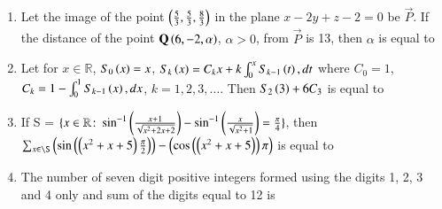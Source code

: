 \documentclass[journal]{IEEEtran}
\begin{document}
\begin{enumerate}
\item Let the image of the point $\left(\frac{5}{3}, \frac{5}{3}, \frac{8}{3}\right)$ in the plane $x - 2y + z - 2 = 0$ be $\vec{P}$. If the distance of the point $\mathbf{Q}\left(6, -2, \alpha\right)$, $\alpha > 0$, from $\vec{P}$ is 13, then $\alpha$ is equal to

\item Let for $x \in \mathbb{R}$, $S_0\left(x\right) = x$, $S_k\left(x\right) = C_kx + k\int_0^x S_{k-1}\left(t\right), dt$ where $C_0 = 1$, $C_k = 1-\int_0^1 S_{k-1}\left(x\right), dx$, $k = 1, 2, 3, \dots$. Then $S_2\left(3\right) + 6C_3$ is equal to

\item If S = $\{x \in \mathbb{R} \colon \sin^{-1}\left(\frac{x+1}{\sqrt{x^2+2x+2}}\right) - \sin^{-1}\left(\frac{x}{\sqrt{x^2+1}}\right) = \frac{\pi}{4}\}$, then $\sum_{x \in \S} \brak{\sin{\brak{\brak{x^2+x+5}\frac{\pi}{2}}}} - \brak{\cos{\brak{\brak{x^2+x+5}}\pi}}$ is equal to

\item The number of seven digit positive integers formed using the digits 1, 2, 3 and 4 only and sum of the digits equal to 12 is
\end{enumerate}
\end{document}
